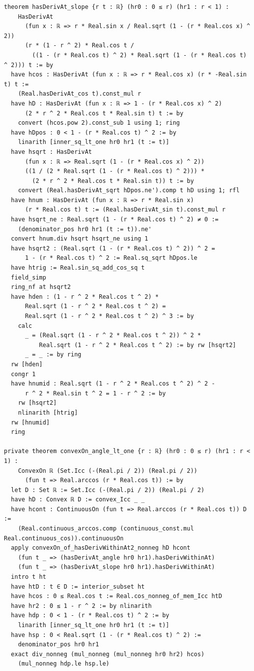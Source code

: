 \documentclass[11pt,a4paper]{article}
\begin{document}
\begin{Verbatim}[breaklines,breakanywhere,fontsize=\footnotesize]
theorem hasDerivAt_slope {r t : ℝ} (hr0 : 0 ≤ r) (hr1 : r < 1) :
    HasDerivAt
      (fun x : ℝ => r * Real.sin x / Real.sqrt (1 - (r * Real.cos x) ^ 2))
      (r * (1 - r ^ 2) * Real.cos t /
        ((1 - (r * Real.cos t) ^ 2) * Real.sqrt (1 - (r * Real.cos t) ^ 2))) t := by
  have hcos : HasDerivAt (fun x : ℝ => r * Real.cos x) (r * -Real.sin t) t :=
    (Real.hasDerivAt_cos t).const_mul r
  have hD : HasDerivAt (fun x : ℝ => 1 - (r * Real.cos x) ^ 2)
      (2 * r ^ 2 * Real.cos t * Real.sin t) t := by
    convert (hcos.pow 2).const_sub 1 using 1; ring
  have hDpos : 0 < 1 - (r * Real.cos t) ^ 2 := by
    linarith [inner_sq_lt_one hr0 hr1 (t := t)]
  have hsqrt : HasDerivAt
      (fun x : ℝ => Real.sqrt (1 - (r * Real.cos x) ^ 2))
      ((1 / (2 * Real.sqrt (1 - (r * Real.cos t) ^ 2))) *
        (2 * r ^ 2 * Real.cos t * Real.sin t)) t := by
    convert (Real.hasDerivAt_sqrt hDpos.ne').comp t hD using 1; rfl
  have hnum : HasDerivAt (fun x : ℝ => r * Real.sin x)
      (r * Real.cos t) t := (Real.hasDerivAt_sin t).const_mul r
  have hsqrt_ne : Real.sqrt (1 - (r * Real.cos t) ^ 2) ≠ 0 :=
    (denominator_pos hr0 hr1 (t := t)).ne'
  convert hnum.div hsqrt hsqrt_ne using 1
  have hsqrt2 : (Real.sqrt (1 - (r * Real.cos t) ^ 2)) ^ 2 =
      1 - (r * Real.cos t) ^ 2 := Real.sq_sqrt hDpos.le
  have htrig := Real.sin_sq_add_cos_sq t
  field_simp
  ring_nf at hsqrt2
  have hden : (1 - r ^ 2 * Real.cos t ^ 2) *
      Real.sqrt (1 - r ^ 2 * Real.cos t ^ 2) =
      Real.sqrt (1 - r ^ 2 * Real.cos t ^ 2) ^ 3 := by
    calc
      _ = (Real.sqrt (1 - r ^ 2 * Real.cos t ^ 2)) ^ 2 *
          Real.sqrt (1 - r ^ 2 * Real.cos t ^ 2) := by rw [hsqrt2]
      _ = _ := by ring
  rw [hden]
  congr 1
  have hnumid : Real.sqrt (1 - r ^ 2 * Real.cos t ^ 2) ^ 2 -
      r ^ 2 * Real.sin t ^ 2 = 1 - r ^ 2 := by
    rw [hsqrt2]
    nlinarith [htrig]
  rw [hnumid]
  ring

private theorem convexOn_angle_lt_one {r : ℝ} (hr0 : 0 ≤ r) (hr1 : r < 1) :
    ConvexOn ℝ (Set.Icc (-(Real.pi / 2)) (Real.pi / 2))
      (fun t => Real.arccos (r * Real.cos t)) := by
  let D : Set ℝ := Set.Icc (-(Real.pi / 2)) (Real.pi / 2)
  have hD : Convex ℝ D := convex_Icc _ _
  have hcont : ContinuousOn (fun t => Real.arccos (r * Real.cos t)) D :=
    (Real.continuous_arccos.comp (continuous_const.mul Real.continuous_cos)).continuousOn
  apply convexOn_of_hasDerivWithinAt2_nonneg hD hcont
    (fun t _ => (hasDerivAt_angle hr0 hr1).hasDerivWithinAt)
    (fun t _ => (hasDerivAt_slope hr0 hr1).hasDerivWithinAt)
  intro t ht
  have htD : t ∈ D := interior_subset ht
  have hcos : 0 ≤ Real.cos t := Real.cos_nonneg_of_mem_Icc htD
  have hr2 : 0 ≤ 1 - r ^ 2 := by nlinarith
  have hdp : 0 < 1 - (r * Real.cos t) ^ 2 := by
    linarith [inner_sq_lt_one hr0 hr1 (t := t)]
  have hsp : 0 < Real.sqrt (1 - (r * Real.cos t) ^ 2) :=
    denominator_pos hr0 hr1
  exact div_nonneg (mul_nonneg (mul_nonneg hr0 hr2) hcos)
    (mul_nonneg hdp.le hsp.le)


\end{Verbatim}
\end{document}
